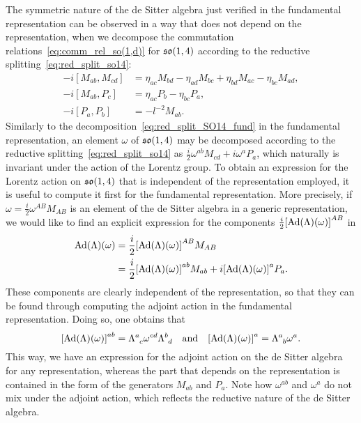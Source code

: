 \documentclass[
final,
11pt,
a4paper,
DIV=11,
headinclude=true,
footinclude=false,
bibliography=totoc,
twoside=true,  %
BCOR=5mm
]{scrbook}
\begin{document}
The symmetric nature of the de Sitter algebra just verified in 
the fundamental representation can be observed in a way that does 
not depend on the representation, when we decompose the 
commutation relations~\eqref{eq:comm_rel_so(1,d)} for 
$\mathfrak{so}(1,4)$ according to the reductive 
splitting~\eqref{eq:red_split_so14}:
\begin{subequations}
\label{eq:comm_relations_so(1,4)}
\begin{align}
  -i[M_{ab},M_{cd}] &= \eta_{ac}M_{bd} - \eta_{ad}M_{bc} + 
  \eta_{bd}M_{ac} - \eta_{bc}M_{ad}, \\
  -i[M_{ab},P_c] &= \eta_{ac}P_b- \eta_{bc}P_a, \\
\label{eq:comm_relations_so(1,4)C}
  -i[P_a,P_b] &= -l^{-2}M_{ab}.
  \end{align}
\end{subequations}
Similarly to the decomposition~\eqref{eq:red_split_SO14_fund} in 
the fundamental representation, an element $\omega$ of 
$\mathfrak{so}(1,4)$ may be decomposed according to the reductive 
splitting~\eqref{eq:red_split_so14} as $\tfrac{i}{2} \omega^{ab} 
M_{cd} + i \omega^a P_a$, which naturally is invariant under the 
action of the Lorentz group. To obtain an expression for the 
Lorentz action on $\mathfrak{so}(1,4)$ that is independent of the 
representation employed, it is useful to compute it first for the 
fundamental representation. More precisely, if $\omega 
= \tfrac{i}{2} \omega^{AB} M_{AB}$ is an element of the de Sitter 
algebra in a generic representation, we would like to find an 
explicit expression for the components $\tfrac{i}{2} 
{[\operatorname{Ad}(\Lambda)(\omega)]}^{AB}$ in
\begin{align*}
  \operatorname{Ad}(\Lambda)(\omega)
  &= \frac{i}{2} {[\operatorname{Ad}(\Lambda)(\omega)]}^{AB} M_{AB}
  \\
  &= \frac{i}{2} {[\operatorname{Ad}(\Lambda)(\omega)]}^{ab} M_{ab}
  + i {[\operatorname{Ad}(\Lambda)(\omega)]}^a P_a.
\end{align*}
These components are clearly independent of the representation, 
so that they can be found through computing the adjoint action in 
the fundamental representation. Doing so, one obtains that
\begin{equation}
  {[\Ad(\Lambda)(\omega)]}^{ab} = \Lambda\ind{^a_c} 
  \omega\ind{^{cd}} \Lambda\ind{^b_d}
  \quad\text{and}\quad
  {[\Ad(\Lambda)(\omega)]}^a = \Lambda\ind{^a_b} \omega^a.
\end{equation}
This way, we have an expression for the adjoint action on the de 
Sitter algebra for any representation, whereas the part that 
depends on the representation is contained in the form of the 
generators $M_{ab}$ and $P_a$. Note how $\omega^{ab}$ and 
$\omega^a$ do not mix under the adjoint action, which reflects 
the reductive nature of the de Sitter algebra.
\end{document}
